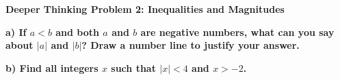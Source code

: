 \documentclass[12pt, letterpaper, fleqn]{article}
\begin{document}
\begin{tcolorbox}[colback=yellow!15, colframe=orange, boxrule=1.5pt, arc=4mm, left=6mm, right=6mm, top=5mm, bottom=5mm]
\textbf{Deeper Thinking Problem 2: Inequalities and Magnitudes}

\medskip

\noindent
\textbf{a) If $a < b$ and both $a$ and $b$ are negative numbers, what can you say about $|a|$ and $|b|$? Draw a number line to justify your answer.}

\vspace{2cm}

\noindent
\textbf{b) Find all integers $x$ such that $|x| < 4$ and $x > -2$.}

\vspace{2cm}
\end{tcolorbox}
\newpage
\end{document}

